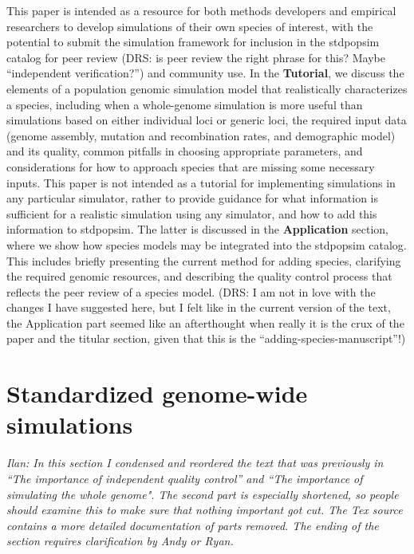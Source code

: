 \documentclass[hidelinks]{article}
\begin{document}
This paper is intended as a resource for both methods
developers and empirical researchers to develop simulations of their own
species of interest, with the potential to submit the simulation
framework for inclusion in the stdpopsim catalog for peer review
(DRS: is peer review the right phrase for this? Maybe ``independent verification?'') and
community use. In the \textbf{Tutorial}, we discuss the elements of a
population genomic simulation model that realistically characterizes a
species, including when a whole-genome simulation is more useful than
simulations based on either individual loci or generic loci, the required input data (genome
assembly, mutation and recombination rates, and demographic model) and
its quality, common pitfalls in choosing appropriate parameters, and
considerations for how to approach species that are missing some
necessary inputs. This paper is not intended as a tutorial for
implementing simulations in any particular simulator, rather to provide
guidance for what information is sufficient for a realistic simulation
using any simulator, and how to add this information to stdpopsim. The latter 
is discussed in the \textbf{Application} section, where we show how
species models may be integrated into the stdpopsim catalog. This includes
briefly presenting the current method for adding species, clarifying the
required genomic resources, and describing the quality control process
that reflects the peer review of a species model.
(DRS: I am not in love with the changes I have suggested here,
but I felt like in the current version of the text, the Application
part seemed like an afterthought when really it is the crux of the paper
and the titular section, given that this is the ``adding-species-manuscript''!)


\hypertarget{sec2}{%
	\section*{Standardized genome-wide simulations}\label{sec:std-sim}}

\noindent\emph{Ilan: In this section I condensed and reordered the text that was previously
	in ``The importance of independent quality control'' and ``The importance of simulating the whole genome". The second part is especially shortened, so people should examine this to make
	sure that nothing important got cut.  The Tex source contains a more detailed documentation
	of parts removed. The ending of the section requires clarification by Andy or Ryan.\vspace{5pt}}
\end{document}
